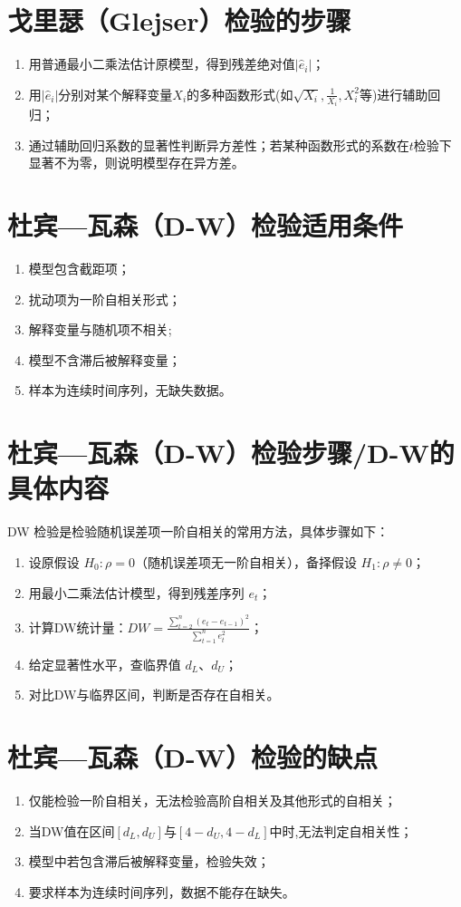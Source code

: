 \documentclass{ctexart}
\begin{document}
\section{戈里瑟（Glejser）检验的步骤}
\begin{enumerate}
\item 用普通最小二乘法估计原模型，得到残差绝对值$|\hat{e}_i|$；
\item 用$|\hat{e}_i|$分别对某个解释变量$X_i$的多种函数形式(如$\sqrt{X_i},\frac{1}{X_i},X_i^2$等)进行辅助回归；
\item 通过辅助回归系数的显著性判断异方差性；若某种函数形式的系数在$t$检验下显著不为零，则说明模型存在异方差。
\end{enumerate}

\section{杜宾—瓦森（D-W）检验适用条件}
\begin{enumerate}
\item 模型包含截距项；
\item 扰动项为一阶自相关形式；
\item 解释变量与随机项不相关;
\item 模型不含滞后被解释变量；
\item 样本为连续时间序列，无缺失数据。
\end{enumerate}

\section{杜宾—瓦森（D-W）检验步骤/D-W的具体内容}

DW 检验是检验随机误差项一阶自相关的常用方法，具体步骤如下：
\begin{enumerate}
\item 设原假设 $H_0: \rho = 0$（随机误差项无一阶自相关），备择假设 $H_1: \rho \neq 0$；
\item 用最小二乘法估计模型，得到残差序列 $e_t$；
\item 计算DW统计量：$DW = \frac{\sum\limits_{t=2}^{n}(e_t - e_{t-1})^2}{\sum\limits_{t=1}^{n} e_t^2}$；
\item 给定显著性水平，查临界值 $d_L$、$d_U$；
\item 对比DW与临界区间，判断是否存在自相关。
\end{enumerate}

\section{杜宾—瓦森（D-W）检验的缺点}
\begin{enumerate}
\item 仅能检验一阶自相关，无法检验高阶自相关及其他形式的自相关；

\item 当DW值在区间\([d_L,d_U]\)与\([4-d_U,4-d_L]\)中时,无法判定自相关性；

\item 模型中若包含滞后被解释变量，检验失效；

\item 要求样本为连续时间序列，数据不能存在缺失。
\end{enumerate}
\end{document}

